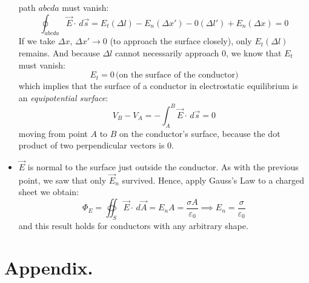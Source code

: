 \documentclass[11pt, letterpaper]{article}
\begin{document}
\begin{itemize}
		path $abcda$ must vanish: \[\oint_{abcda}\vec{E}\cdot\, d\vec{s} = E_t(\Delta l) - E_n(\Delta
		x') - 0(\Delta l') + E_n(\Delta x) = 0\] If we take $\Delta x, \, \Delta x' \to 0$ (to approach the
		surface closely), only $E_t(\Delta l)$ remains. And because $\Delta l$ cannot necessarily 
		approach 0, we know that $E_t$ must vanish:
		\begin{equation}
			\boxed{E_t = 0\, \text{(on the surface of the conductor)}}
		\end{equation}
		which implies that the surface of a conductor in electrostatic equilibrium is an 
		\textit{equipotential surface}:\[V_B - V_A = -\int_A^B\vec{E}\cdot\, d\vec{s} = 0\] moving from 
		point $A$ to $B$ on the conductor's surface, because the dot product of two perpendicular 
		vectors is 0.
		\item $\vec{E}$ is normal to the surface just outside the conductor. As with the previous point,
		we saw that only $\vec{E}_n$ survived. Hence, apply Gauss's Law to a charged sheet we
		obtain:\[\Phi_E = \oiint_S\vec{E}\cdot\, d\vec{A} = E_nA = \frac{\sigma A}{\varepsilon_0} 
		\implies \boxed{E_n = \frac{\sigma}{\varepsilon_0}}\] and this result holds for conductors
		with any arbitrary shape.
	\end{itemize}
	
	\pagebreak	
	
	\section{Appendix.}
	\label{Appendix}
	
\end{document}

